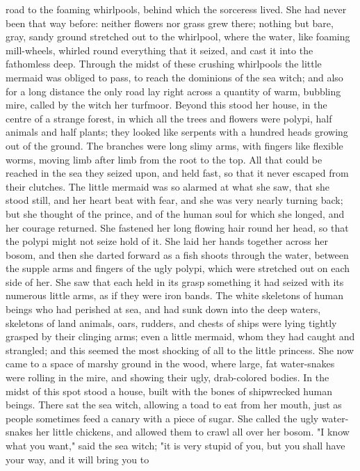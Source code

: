 road to the foaming whirlpools, behind which the sorceress lived.
She had never been that way before: neither flowers nor grass grew
there; nothing but bare, gray, sandy ground stretched out to the
whirlpool, where the water, like foaming mill-wheels, whirled round
everything that it seized, and cast it into the fathomless deep.
Through the midst of these crushing whirlpools the little mermaid
was obliged to pass, to reach the dominions of the sea witch; and also
for a long distance the only road lay right across a quantity of warm,
bubbling mire, called by the witch her turfmoor. Beyond this stood her
house, in the centre of a strange forest, in which all the trees and
flowers were polypi, half animals and half plants; they looked like
serpents with a hundred heads growing out of the ground. The
branches were long slimy arms, with fingers like flexible worms,
moving limb after limb from the root to the top. All that could be
reached in the sea they seized upon, and held fast, so that it never
escaped from their clutches. The little mermaid was so alarmed at what
she saw, that she stood still, and her heart beat with fear, and she
was very nearly turning back; but she thought of the prince, and of
the human soul for which she longed, and her courage returned. She
fastened her long flowing hair round her head, so that the polypi
might not seize hold of it. She laid her hands together across her
bosom, and then she darted forward as a fish shoots through the water,
between the supple arms and fingers of the ugly polypi, which were
stretched out on each side of her. She saw that each held in its grasp
something it had seized with its numerous little arms, as if they were
iron bands. The white skeletons of human beings who had perished at
sea, and had sunk down into the deep waters, skeletons of land
animals, oars, rudders, and chests of ships were lying tightly grasped
by their clinging arms; even a little mermaid, whom they had caught
and strangled; and this seemed the most shocking of all to the
little princess.
    She now came to a space of marshy ground in the wood, where large,
fat water-snakes were rolling in the mire, and showing their ugly,
drab-colored bodies. In the midst of this spot stood a house, built
with the bones of shipwrecked human beings. There sat the sea witch,
allowing a toad to eat from her mouth, just as people sometimes feed a
canary with a piece of sugar. She called the ugly water-snakes her
little chickens, and allowed them to crawl all over her bosom.
    "I know what you want," said the sea witch; "it is very stupid
of you, but you shall have your way, and it will bring you to
